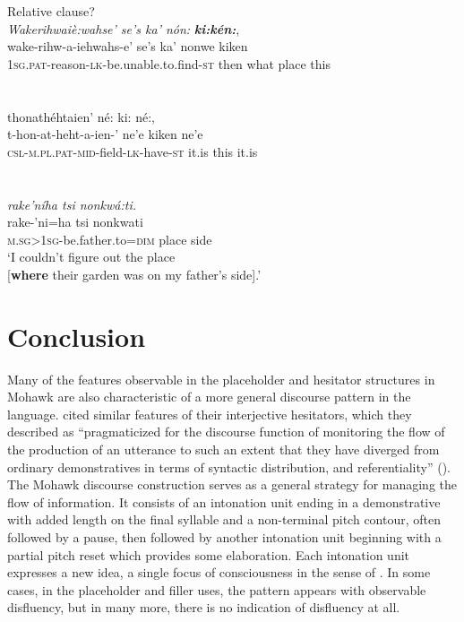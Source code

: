 \documentclass[output=paper]{langscibook}
\begin{document}
\z

\ea%
    \label{ex:mithun:27}
    Relative clause?\\
\glll      \textit{Wakerihwaiè:wahse’                    se’s   ka’  nón:} \textbf{\textit{ki:kén:}},\\
 wake-rihw-a-iehwahs-e’                  se’s   ka’   nonwe   kiken\\
      \textsc{1sg.pat-}reason-\textsc{lk}{}-be.unable.to.find-\textsc{st}  then   what place this\\~\\~\\

\glll thonathéhtaien’                    né:    ki:    né:,\\
t-hon-at-heht-a-ien-’                ne’e    kiken  ne’e\\
      \textsc{csl-m.pl.pat-mid}{}-field-\textsc{lk-}have-\textsc{st}    it.is    this    it.is\\~\\~\\

 \glll     \textit{rake’níha                  tsi    nonkwá:ti.}\\
      rake-’ni=ha                tsi    nonkwati\\
      \textsc{m.sg>1sg}{}-be.father.to=\textsc{dim}  place  side\\

      \glt      ‘I couldn’t figure out the place\\
          {[}\textbf{where} their garden was on my father’s side].’

\z

\section{Conclusion}
\label{sec:mithun:8}
\largerpage
Many of the features observable in the placeholder and hesitator structures in Mohawk are also characteristic of a more general discourse pattern in the language. \citet{HayashiYoon2006} cited similar features of their interjective hesitators, which they described as “pragmaticized for the discourse function of monitoring the flow of the production of an utterance to such an extent that they have diverged from ordinary demonstratives in terms of syntactic distribution, and referentiality” (\citeyear[488]{HayashiYoon2006}). The Mohawk discourse construction serves as a general strategy for managing the flow of information. It consists of an intonation unit ending in a demonstrative with added length on the final syllable and a non-terminal pitch contour, often followed by a pause, then followed by another intonation unit beginning with a partial pitch reset which provides some elaboration. Each intonation unit expresses a new idea, a single focus of consciousness in the sense of \citet{Chafe1980,Chafe1994}. In some cases, in the placeholder and filler uses, the pattern appears with observable disfluency, but in many more, there is no indication of disfluency at all. 
\end{document}
